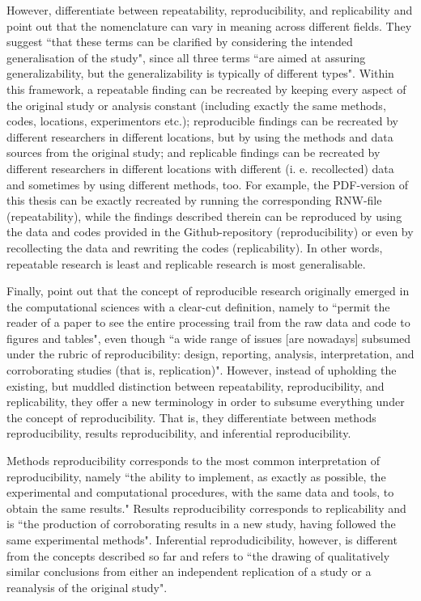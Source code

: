 \documentclass[11pt, a4paper,twoside]{report}\usepackage[]{graphicx}\usepackage[]{color}
\begin{document}
However, \cite{kenett2015clarifying} differentiate between repeatability, reproducibility, and replicability and point out that the nomenclature can vary in meaning across different fields. They suggest ``that these terms can be clarified by considering the intended generalisation of the study", since all three terms ``are aimed at assuring generalizability, but the generalizability is typically of different types". Within this framework, a repeatable finding can be recreated by keeping every aspect of the original study or analysis constant (including exactly the same methods, codes, locations, experimentors etc.); reproducible findings can be recreated by different researchers in different locations, but by using the methods and data sources from the original study; and replicable findings can be recreated by different researchers in different locations with different (i. e. recollected) data and sometimes by using different methods, too. For example, the PDF-version of this thesis can be exactly recreated by running the corresponding RNW-file (repeatability), while the findings described therein can be reproduced by using the data and codes provided in the Github-repository (reproducibility) or even by recollecting the data and rewriting the codes (replicability). In other words, repeatable research is least and replicable research is most generalisable.

Finally, \cite{goodman_what_2016} point out that the concept of reproducible research originally emerged in the computational sciences with a clear-cut definition, namely to ``permit the reader of a paper to see the entire processing trail from the raw data and code to figures and tables", even though ``a wide range of issues [are nowadays] subsumed under the rubric of reproducibility: design, reporting, analysis, interpretation, and corroborating studies (that is, replication)". However, instead of upholding the existing, but muddled distinction between repeatability, reproducibility, and replicability, they offer a new terminology in order to subsume everything under the concept of reproducibility. That is, they differentiate between methods reproducibility, results reproducibility, and inferential reproducibility. 

Methods reproducibility corresponds to the most common interpretation of reproducibility, namely ``the ability to implement, as exactly as possible, the experimental and computational procedures, with the same data and tools, to obtain the same results." Results reproducibility corresponds to replicability and is ``the production of corroborating results in a new study, having followed the same experimental methods". Inferential reprodudicibility, however, is different from the concepts described so far and refers to ``the drawing of qualitatively similar conclusions from either an independent replication of a study or a reanalysis of the original study".
\end{document}
